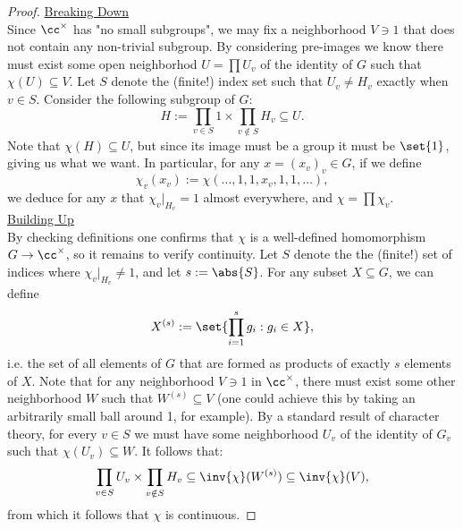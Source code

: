 \documentclass[11pt, x11names, openany]{book}
\begin{document}
\begin{proof}
\underline{Breaking Down}\\
Since $\cc^\times$ has "no small subgroups", we may fix a neighborhood $V \ni 1$ that does not contain any non-trivial subgroup. By considering pre-images we know there must exist some open neighborhod $U  = \prod U_v$ of the identity of $G$ such that $\chi(U) \subseteq V$. Let $S$ denote the (finite!) index set such that $U_v \neq H_v$ exactly when $v \in S$. Consider the following subgroup of $G$:
\begin{equation*}
    H := \prod_{v \in S} {1} \times \prod_{v \notin S} H_v \subseteq U.
\end{equation*}
Note that $\chi(H) \subseteq U$, but since its image must be a group it must be $\set{1}$, giving us what we want. In particular, for any $x = (x_v)_v \in G$, if we define
\begin{equation*}
    \chi_v(x_v) := \chi( \ldots, 1, 1, x_v, 1, 1, \ldots ),
\end{equation*}
we deduce for any $x$ that $\chi_v \vert_{H_v} = 1$ almost everywhere, and $\chi = \prod \chi_v$.\\

\underline{Building Up}\\
By checking definitions one confirms that $\chi$ is a well-defined homomorphism $G \to \cc^\times$, so it remains to verify continuity. Let $S$ denote the the (finite!) set of indices where $\chi_v \vert_{H_v} \neq 1$, and let $s := \abs{S}$. For any subset $X \subseteq G$, we can define 
\begin{equation*}
    X^{(s)} := \set{\prod_{i = 1}^s g_i : g_i \in X},
\end{equation*}
i.e. the set of all elements of $G$ that are formed as products of exactly $s$ elements of $X$. Note that for any neighborhood $V \ni 1 $ in $\cc^\times$, there must exist some other neighborhood $W$ such that $W^{(s)} \subseteq V$ (one could achieve this by taking an arbitrarily small ball around 1, for example). By a standard result of character theory, for every $v \in S$ we must have some neighborhood $U_v$ of the identity of $G_v$ such that $\chi(U_v) \subseteq W$. It follows that:
\begin{equation*}
    \prod_{v \in S} U_v \times \prod_{v \notin S} H_v \subseteq \inv{\chi}(W^{(s)}) \subseteq \inv{\chi}(V),
\end{equation*}
from which it follows that $\chi$ is continuous.
\end{proof}
\end{document}
